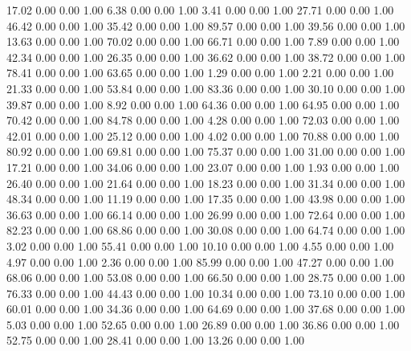    17.02   0.00   0.00   1.00
    6.38   0.00   0.00   1.00
    3.41   0.00   0.00   1.00
   27.71   0.00   0.00   1.00
   46.42   0.00   0.00   1.00
   35.42   0.00   0.00   1.00
   89.57   0.00   0.00   1.00
   39.56   0.00   0.00   1.00
   13.63   0.00   0.00   1.00
   70.02   0.00   0.00   1.00
   66.71   0.00   0.00   1.00
    7.89   0.00   0.00   1.00
   42.34   0.00   0.00   1.00
   26.35   0.00   0.00   1.00
   36.62   0.00   0.00   1.00
   38.72   0.00   0.00   1.00
   78.41   0.00   0.00   1.00
   63.65   0.00   0.00   1.00
    1.29   0.00   0.00   1.00
    2.21   0.00   0.00   1.00
   21.33   0.00   0.00   1.00
   53.84   0.00   0.00   1.00
   83.36   0.00   0.00   1.00
   30.10   0.00   0.00   1.00
   39.87   0.00   0.00   1.00
    8.92   0.00   0.00   1.00
   64.36   0.00   0.00   1.00
   64.95   0.00   0.00   1.00
   70.42   0.00   0.00   1.00
   84.78   0.00   0.00   1.00
    4.28   0.00   0.00   1.00
   72.03   0.00   0.00   1.00
   42.01   0.00   0.00   1.00
   25.12   0.00   0.00   1.00
    4.02   0.00   0.00   1.00
   70.88   0.00   0.00   1.00
   80.92   0.00   0.00   1.00
   69.81   0.00   0.00   1.00
   75.37   0.00   0.00   1.00
   31.00   0.00   0.00   1.00
   17.21   0.00   0.00   1.00
   34.06   0.00   0.00   1.00
   23.07   0.00   0.00   1.00
    1.93   0.00   0.00   1.00
   26.40   0.00   0.00   1.00
   21.64   0.00   0.00   1.00
   18.23   0.00   0.00   1.00
   31.34   0.00   0.00   1.00
   48.34   0.00   0.00   1.00
   11.19   0.00   0.00   1.00
   17.35   0.00   0.00   1.00
   43.98   0.00   0.00   1.00
   36.63   0.00   0.00   1.00
   66.14   0.00   0.00   1.00
   26.99   0.00   0.00   1.00
   72.64   0.00   0.00   1.00
   82.23   0.00   0.00   1.00
   68.86   0.00   0.00   1.00
   30.08   0.00   0.00   1.00
   64.74   0.00   0.00   1.00
    3.02   0.00   0.00   1.00
   55.41   0.00   0.00   1.00
   10.10   0.00   0.00   1.00
    4.55   0.00   0.00   1.00
    4.97   0.00   0.00   1.00
    2.36   0.00   0.00   1.00
   85.99   0.00   0.00   1.00
   47.27   0.00   0.00   1.00
   68.06   0.00   0.00   1.00
   53.08   0.00   0.00   1.00
   66.50   0.00   0.00   1.00
   28.75   0.00   0.00   1.00
   76.33   0.00   0.00   1.00
   44.43   0.00   0.00   1.00
   10.34   0.00   0.00   1.00
   73.10   0.00   0.00   1.00
   60.01   0.00   0.00   1.00
   34.36   0.00   0.00   1.00
   64.69   0.00   0.00   1.00
   37.68   0.00   0.00   1.00
    5.03   0.00   0.00   1.00
   52.65   0.00   0.00   1.00
   26.89   0.00   0.00   1.00
   36.86   0.00   0.00   1.00
   52.75   0.00   0.00   1.00
   28.41   0.00   0.00   1.00
   13.26   0.00   0.00   1.00
